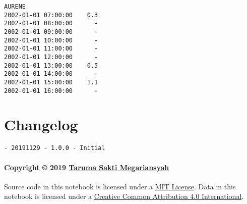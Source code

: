 \documentclass[11pt]{article}
\makeatletter
\newcommand{\boxspacing}{\kern\kvtcb@left@rule\kern\kvtcb@boxsep}
\newcommand{\prompt}[4]{
        \ttfamily\llap{{\color{#2}[#3]:\hspace{3pt}#4}}\vspace{-\baselineskip}
    }
\makeatother
\begin{document}
            \begin{tcolorbox}[breakable, size=fbox, boxrule=.5pt, pad at break*=1mm, opacityfill=0]
\prompt{Out}{outcolor}{13}{\boxspacing}
\begin{Verbatim}[commandchars=\\\{\}]
                    AURENE
2002-01-01 07:00:00    0.3
2002-01-01 08:00:00      -
2002-01-01 09:00:00      -
2002-01-01 10:00:00      -
2002-01-01 11:00:00      -
2002-01-01 12:00:00      -
2002-01-01 13:00:00    0.5
2002-01-01 14:00:00      -
2002-01-01 15:00:00    1.1
2002-01-01 16:00:00      -
\end{Verbatim}
\end{tcolorbox}
        
    \hypertarget{changelog}{%
\section{Changelog}\label{changelog}}

\begin{verbatim}
- 20191129 - 1.0.0 - Initial
\end{verbatim}

\hypertarget{copyright-2019-taruma-sakti-megariansyah}{%
\paragraph{\texorpdfstring{Copyright © 2019
\href{https://taruma.github.io}{Taruma Sakti
Megariansyah}}{Copyright © 2019 Taruma Sakti Megariansyah}}\label{copyright-2019-taruma-sakti-megariansyah}}

Source code in this notebook is licensed under a
\href{https://choosealicense.com/licenses/mit/}{MIT License}. Data in
this notebook is licensed under a
\href{https://creativecommons.org/licenses/by/4.0/}{Creative Common
Attribution 4.0 International}.


    
    
    
\end{document}
